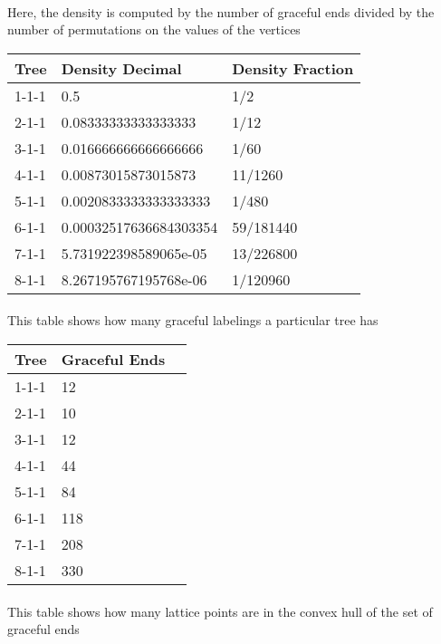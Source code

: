 \documentclass{article}
\begin{document}
\paragraph{} Here, the density is computed by the number of             graceful ends divided by the number of permutations on the             values of the vertices
\begin{center}
              \begin{tabular}{| l | l | l |}
              \hline
              Tree & Density Decimal & Density Fraction \\ 
              \hline 
1-1-1 & 0.5 & 1/2\\
\hline
2-1-1 & 0.08333333333333333 & 1/12\\
\hline
3-1-1 & 0.016666666666666666 & 1/60\\
\hline
4-1-1 & 0.00873015873015873 & 11/1260\\
\hline
5-1-1 & 0.0020833333333333333 & 1/480\\
\hline
6-1-1 & 0.00032517636684303354 & 59/181440\\
\hline
7-1-1 & 5.731922398589065e-05 & 13/226800\\
\hline
8-1-1 & 8.267195767195768e-06 & 1/120960\\
\hline
\hline
              \end{tabular}
              \end{center}\paragraph{} This table shows how many graceful labelings             a particular tree has
\begin{center}
              \begin{tabular}{| l | l | l |}
              \hline
              Tree & Graceful Ends \\ 
              \hline
1-1-1 & 12\\
\hline
2-1-1 & 10\\
\hline
3-1-1 & 12\\
\hline
4-1-1 & 44\\
\hline
5-1-1 & 84\\
\hline
6-1-1 & 118\\
\hline
7-1-1 & 208\\
\hline
8-1-1 & 330\\
\hline
\hline
              \end{tabular}
              \end{center}\paragraph{} This table shows how many lattice points are in             the convex hull of the set of graceful ends
\end{document}

